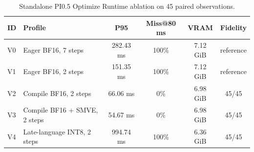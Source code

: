 \begin{table}
\caption{Standalone PI0.5 Optimize Runtime ablation on 45 paired observations.}
\label{tab:efficiency_full}
\centering\footnotesize
\begin{tabular}{llcccc}
\toprule
ID & Profile & P95 & Miss@80 ms & VRAM & Fidelity \\
\midrule
V0 & Eager BF16, 7 steps & 282.43 ms & 100\% & 7.12 GiB & reference \\
V1 & Eager BF16, 2 steps & 151.35 ms & 100\% & 7.12 GiB & reference \\
V2 & Compile BF16, 2 steps & 66.06 ms & 0\% & 6.98 GiB & 45/45 \\
V3 & Compile BF16 + SMVE, 2 steps & 54.67 ms & 0\% & 6.98 GiB & 45/45 \\
V4 & Late-language INT8, 2 steps & 994.74 ms & 100\% & 6.36 GiB & 45/45 \\
\bottomrule
\end{tabular}
\end{table}
